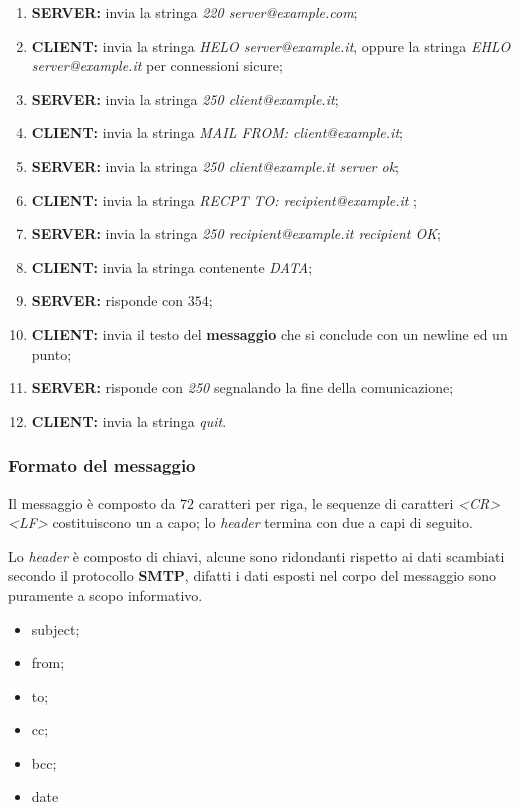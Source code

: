 \begin{enumerate}
  \item \textbf{SERVER:} invia la stringa \emph{220 server@example.com};
  \item \textbf{CLIENT:} invia la stringa \emph{HELO server@example.it}, oppure
    la stringa \emph{EHLO server@example.it} per connessioni sicure;
  \item \textbf{SERVER:} invia la stringa \emph{250 client@example.it};
  \item \textbf{CLIENT:} invia la stringa \emph{MAIL FROM: client@example.it};
  \item \textbf{SERVER:} invia la stringa \emph{250 client@example.it server
    ok};
  \item \textbf{CLIENT:} invia la stringa \emph{RECPT TO: recipient@example.it}
    ;
  \item \textbf{SERVER:} invia la stringa \emph{250 recipient@example.it 
    recipient OK};
  \item \textbf{CLIENT:} invia la stringa contenente \emph{DATA};
  \item \textbf{SERVER:} risponde con $354$;
  \item \textbf{CLIENT:} invia il testo del \textbf{messaggio} che si conclude
    con un newline ed un punto;
  \item \textbf{SERVER:} risponde con \emph{250} segnalando la fine della
    comunicazione;
  \item \textbf{CLIENT:} invia la stringa \emph{quit}.
\end{enumerate}

\subsubsection{Formato del messaggio}
Il messaggio è composto da $72$ caratteri per riga, le sequenze di caratteri
\emph{<CR><LF>} costituiscono un a capo; lo \emph{header} termina con due
a capi di seguito.

Lo \emph{header} è composto di chiavi, alcune sono ridondanti rispetto ai dati
scambiati secondo il protocollo \textbf{SMTP}, difatti i dati esposti nel
corpo del messaggio sono puramente a scopo informativo.
\begin{itemize}
  \item subject;
  \item from;
  \item to;
  \item cc;
  \item bcc;
  \item date
\end{itemize}


